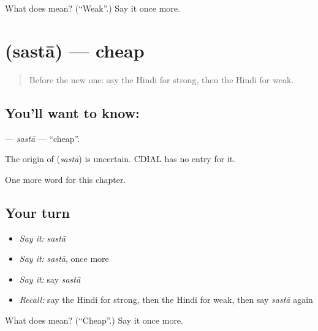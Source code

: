 \begin{tcolorbox}[breakable,colback=teal!4,colframe=teal!35!black,title={Before you move on}]
What does  mean? (\textquotedblleft{}Weak\textquotedblright{}.) Say it once more.
\end{tcolorbox}
\section[\texorpdfstring{\hi{सस्ता} (sastā)}{सस्ता (sastā)}]{ (sastā) — cheap}

\label{lesson:HI-C212-sasta}



\begin{quote}
Before the new one: say the Hindi for strong, then the Hindi for weak.
\end{quote}

\subsection*{You'll want to know: }
\textbf{} — \emph{sastā} — \textquotedblleft{}cheap\textquotedblright{}.

\begin{cousinweb}
The origin of \textbf{} (\emph{sastā}) is uncertain. CDIAL has no entry for it.
\end{cousinweb}

\begin{grammarlens}[title={What you've built}]
One more word for this chapter.
\end{grammarlens}

\subsection*{Your turn}
\begin{itemize}
\raggedright
  \item \emph{Say it:} \emph{sastā}
  \item \emph{Say it:} \emph{sastā}, once more
  \item \emph{Say it:} say \emph{sastā}
  \item \emph{Recall:} say the Hindi for strong, then the Hindi for weak, then say \emph{sastā} again
\end{itemize}

\begin{tcolorbox}[breakable,colback=teal!4,colframe=teal!35!black,title={Before you move on}]
What does  mean? (\textquotedblleft{}Cheap\textquotedblright{}.) Say it once more.
\end{tcolorbox}
